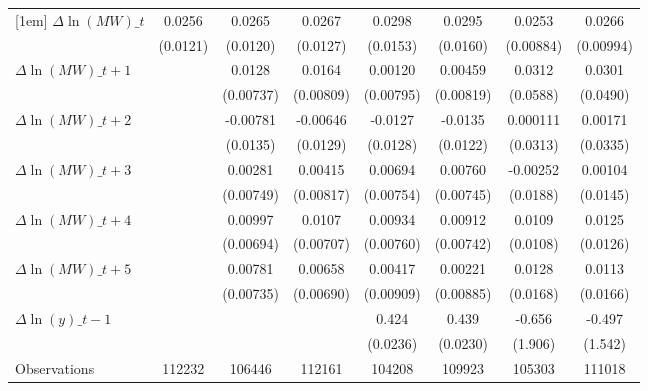 {\begin{tabular}{l*{7}{c}}
[1em]
$\Delta \ln(MW)\_{t}$&   0.0256\sym{**} &   0.0265\sym{**} &   0.0267\sym{**} &   0.0298\sym{*}  &   0.0295\sym{*}  &   0.0253\sym{***}&   0.0266\sym{**} \\
          & (0.0121)         & (0.0120)         & (0.0127)         & (0.0153)         & (0.0160)         &(0.00884)         &(0.00994)         \\
[1em]
$\Delta \ln(MW)\_{t+1}$&                  &   0.0128\sym{*}  &   0.0164\sym{**} &  0.00120         &  0.00459         &   0.0312         &   0.0301         \\
          &                  &(0.00737)         &(0.00809)         &(0.00795)         &(0.00819)         & (0.0588)         & (0.0490)         \\
[1em]
$\Delta \ln(MW)\_{t+2}$&                  & -0.00781         & -0.00646         &  -0.0127         &  -0.0135         & 0.000111         &  0.00171         \\
          &                  & (0.0135)         & (0.0129)         & (0.0128)         & (0.0122)         & (0.0313)         & (0.0335)         \\
[1em]
$\Delta \ln(MW)\_{t+3}$&                  &  0.00281         &  0.00415         &  0.00694         &  0.00760         & -0.00252         &  0.00104         \\
          &                  &(0.00749)         &(0.00817)         &(0.00754)         &(0.00745)         & (0.0188)         & (0.0145)         \\
[1em]
$\Delta \ln(MW)\_{t+4}$&                  &  0.00997         &   0.0107         &  0.00934         &  0.00912         &   0.0109         &   0.0125         \\
          &                  &(0.00694)         &(0.00707)         &(0.00760)         &(0.00742)         & (0.0108)         & (0.0126)         \\
[1em]
$\Delta \ln(MW)\_{t+5}$&                  &  0.00781         &  0.00658         &  0.00417         &  0.00221         &   0.0128         &   0.0113         \\
          &                  &(0.00735)         &(0.00690)         &(0.00909)         &(0.00885)         & (0.0168)         & (0.0166)         \\
[1em]
$\Delta \ln(y)\_{t-1}$&                  &                  &                  &    0.424\sym{***}&    0.439\sym{***}&   -0.656         &   -0.497         \\
          &                  &                  &                  & (0.0236)         & (0.0230)         &  (1.906)         &  (1.542)         \\
\hline
Observations&   112232         &   106446         &   112161         &   104208         &   109923         &   105303         &   111018         \\
\hline\hline
\end{tabular}
}
